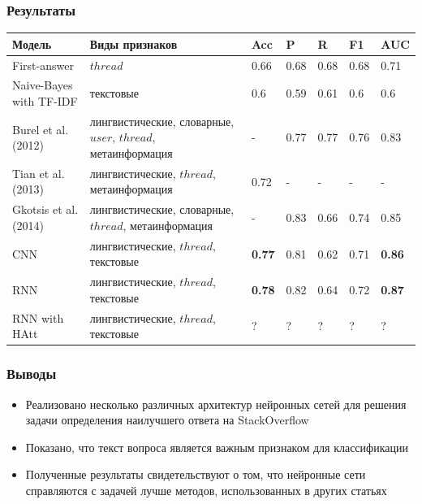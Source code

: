 \documentclass[10pt]{beamer}
\begin{document}

\begin{frame}
\frametitle{Результаты}

\begin{center}
	\small
    \begin{tabularx}{\textwidth}{| l | X | l | l | l | l | l |}
    \hline
    \textbf{Модель} & \textbf{Виды признаков} & \textbf{Acc} & \textbf{P} & \textbf{R} & \textbf{F1} & \textbf{AUC} \\ \hline
    First-answer & $thread$ & 0.66 & 0.68 & 0.68 & 0.68 & 0.71 \\ \hline
    Naive-Bayes with TF-IDF & текстовые & 0.6 & 0.59 & 0.61 & 0.6 &0.6 \\ \hline
    \hline
    Burel et al. (2012) & лингвистические, словарные, $user$, $thread$, метаинформация & - & 0.77 & 0.77 & 0.76 & 0.83 \\ \hline
    Tian et al. (2013) & лингвистические, $thread$, метаинформация & 0.72 & - & - & - & - \\ \hline
    Gkotsis et al. (2014) & лингвистические, словарные, $thread$, метаинформация & - & 0.83 & 0.66 & 0.74 & 0.85 \\ \hline
    \hline
    CNN & лингвистические, $thread$, текстовые & \textbf{0.77} & 0.81 & 0.62 & 0.71 & \textbf{0.86} \\ \hline
    RNN & лингвистические, $thread$, текстовые & \textbf{0.78} & 0.82 & 0.64 & 0.72 & \textbf{0.87} \\ \hline
    RNN with HAtt & лингвистические, $thread$, текстовые & ? & ? & ? & ? & ? \\ \hline
    \end{tabularx}
\end{center}
\end{frame}


\begin{frame}
\frametitle{Выводы}

\begin{itemize}
	\item Реализовано несколько различных архитектур нейронных сетей для решения задачи определения наилучшего ответа на StackOverflow
	\item Показано, что текст вопроса является важным признаком для классификации
	\item Полученные результаты свидетельствуют о том, что нейронные сети справляются с задачей лучше методов, использованных в других статьях
\end{itemize}

\end{frame}


\end{document}
